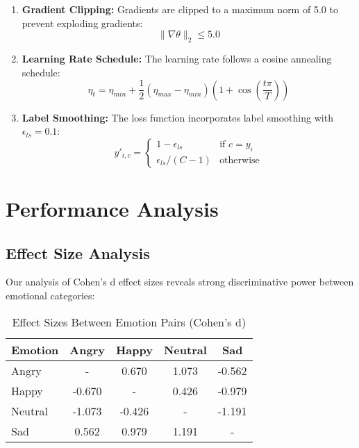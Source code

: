 \documentclass[12pt,a4paper]{article}
\begin{document}
\begin{enumerate}
    \item \textbf{Gradient Clipping:} Gradients are clipped to a maximum norm of 5.0 to prevent exploding gradients:
    \begin{equation}
        \|\nabla \theta\|_2 \leq 5.0
    \end{equation}
    
    \item \textbf{Learning Rate Schedule:} The learning rate follows a cosine annealing schedule:
    \begin{equation}
        \eta_t = \eta_{min} + \frac{1}{2}(\eta_{max} - \eta_{min})(1 + \cos(\frac{t\pi}{T}))
    \end{equation}
    
    \item \textbf{Label Smoothing:} The loss function incorporates label smoothing with $\epsilon_{ls}=0.1$:
    \begin{equation}
        y'_{i,c} = \begin{cases}
            1 - \epsilon_{ls} & \text{if } c = y_i \\
            \epsilon_{ls}/(C-1) & \text{otherwise}
        \end{cases}
    \end{equation}
\end{enumerate}

\section{Performance Analysis}
\subsection{Effect Size Analysis}
Our analysis of Cohen's d effect sizes reveals strong discriminative power between emotional categories:

\begin{table}[H]
\centering
\caption{Effect Sizes Between Emotion Pairs (Cohen's d)}
\begin{tabular}{lcccc}
\toprule
Emotion & Angry & Happy & Neutral & Sad \\
\midrule
Angry & - & 0.670 & 1.073 & -0.562 \\
Happy & -0.670 & - & 0.426 & -0.979 \\
Neutral & -1.073 & -0.426 & - & -1.191 \\
Sad & 0.562 & 0.979 & 1.191 & - \\
\bottomrule
\end{tabular}
\label{tab:effect_sizes}
\end{table}
\end{document}
